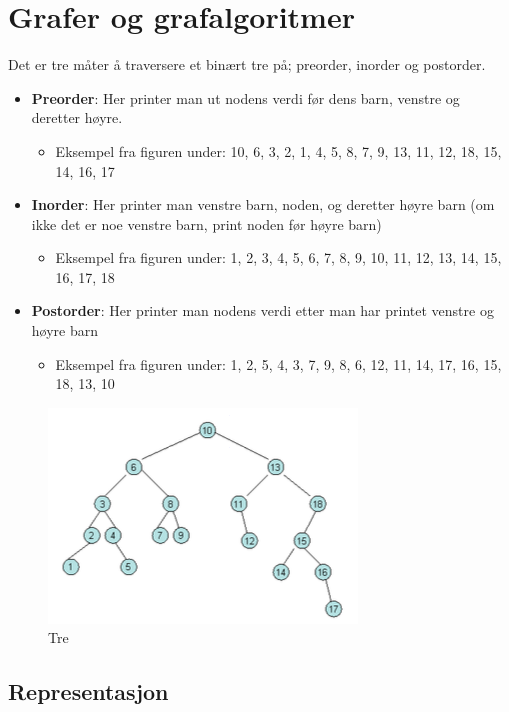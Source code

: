 \section{Grafer og grafalgoritmer}
Det er tre måter å traversere et binært tre på; preorder, inorder og postorder.
\begin{itemize}
    \item \textbf{Preorder}: Her printer man ut nodens verdi før dens barn, venstre og deretter høyre. 
    \begin{itemize}
        \item Eksempel fra figuren under: 10, 6, 3, 2, 1, 4, 5, 8, 7, 9, 13, 11, 12, 18, 15, 14, 16, 17
    \end{itemize}
    \item \textbf{Inorder}: Her printer man venstre barn, noden, og deretter høyre barn (om ikke det er noe venstre barn, print noden før høyre barn)
    \begin{itemize}
        \item Eksempel fra figuren under: 1, 2, 3, 4, 5, 6, 7, 8, 9, 10, 11, 12, 13, 14, 15, 16, 17, 18
    \end{itemize}
    \item \textbf{Postorder}: Her printer man nodens verdi etter man har printet venstre og høyre barn
    \begin{itemize}
        \item Eksempel fra figuren under: 1, 2, 5, 4, 3, 7, 9, 8, 6, 12, 11, 14, 17, 16, 15, 18, 13, 10
    \end{itemize}
\end{itemize}

\begin{figure}[H]
\includegraphics[scale=0.7]{images/tregraf}
\centering %
\caption{Tre}
\label{fig:tregraf}
\end{figure}

\subsection{Representasjon}
